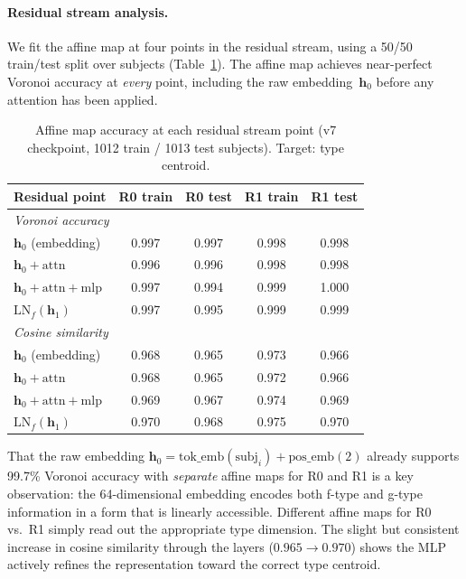 \documentclass[11pt,a4paper]{article}
\newcommand{\bh}{\mathbf{h}}
\newcommand{\lnorm}{\mathrm{LN}}
\begin{document}
\paragraph{Residual stream analysis.}
We fit the affine map at four points in the residual stream, using a
50/50 train/test split over subjects (Table~\ref{tab:residual}). The
affine map achieves near-perfect Voronoi accuracy at \emph{every}
point, including the raw embedding~$\bh_0$ before any attention has
been applied.

\begin{table}[t]
\centering
\caption{Affine map accuracy at each residual stream point (v7
  checkpoint, 1012 train / 1013 test subjects). Target: type centroid.}
\label{tab:residual}
\begin{tabular}{lcccc}
\toprule
Residual point & R0 train & R0 test & R1 train & R1 test \\
\midrule
\multicolumn{5}{l}{\emph{Voronoi accuracy}} \\
$\bh_0$ (embedding) & 0.997 & 0.997 & 0.998 & 0.998 \\
$\bh_0 + \text{attn}$ & 0.996 & 0.996 & 0.998 & 0.998 \\
$\bh_0 + \text{attn} + \text{mlp}$ & 0.997 & 0.994 & 0.999 & 1.000 \\
$\lnorm_f(\bh_1)$ & 0.997 & 0.995 & 0.999 & 0.999 \\
\midrule
\multicolumn{5}{l}{\emph{Cosine similarity}} \\
$\bh_0$ (embedding) & 0.968 & 0.965 & 0.973 & 0.966 \\
$\bh_0 + \text{attn}$ & 0.968 & 0.965 & 0.972 & 0.966 \\
$\bh_0 + \text{attn} + \text{mlp}$ & 0.969 & 0.967 & 0.974 & 0.969 \\
$\lnorm_f(\bh_1)$ & 0.970 & 0.968 & 0.975 & 0.970 \\
\bottomrule
\end{tabular}
\end{table}

That the raw embedding $\bh_0 = \mathrm{tok\_emb}(\text{subj}_i) +
\mathrm{pos\_emb}(2)$ already supports 99.7\% Voronoi accuracy with
\emph{separate} affine maps for R0 and R1 is a key observation: the
64-dimensional embedding encodes both f-type and g-type information in
a form that is linearly accessible. Different affine maps for R0
vs.\ R1 simply read out the appropriate type dimension. The slight but
consistent increase in cosine similarity through the layers
($0.965 \to 0.970$) shows the MLP actively refines the representation
toward the correct type centroid.
\end{document}
